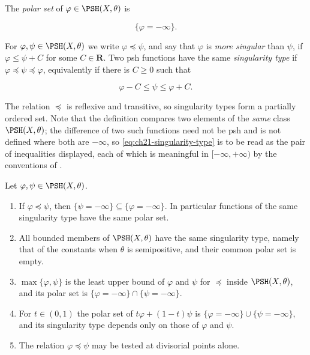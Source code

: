 \begin{definition}
\label{def:ch21-polar-singularity}
The \emph{polar set} of $\varphi\in\PSH(X,\theta)$ is

\[
                         \{\varphi=-\infty\}.
\]

For $\varphi,\psi\in\PSH(X,\theta)$ we write $\varphi\preceq\psi$, and
say that $\varphi$ is \emph{more singular} than $\psi$, if
$\varphi\leq\psi+C$ for some $C\in\mathbf R$.  Two psh functions have
the same \emph{singularity type} if
$\varphi\preceq\psi\preceq\varphi$, equivalently if there is
$C\geq0$ such that

\begin{equation}
\label{eq:ch21-singularity-type}
                         \varphi-C\leq\psi\leq\varphi+C.
\end{equation}
\end{definition}

The relation $\preceq$ is reflexive and transitive, so singularity types
form a partially ordered set.  Note that the definition compares two
elements of the \emph{same} class $\PSH(X,\theta)$; the difference of two
such functions need not be psh and is not defined where both are
$-\infty$, so \eqref{eq:ch21-singularity-type} is to be
read as the pair of inequalities displayed, each of which is meaningful in
$[-\infty,+\infty)$ by the conventions of
.

\begin{proposition}
\label{prop:ch21-singularity-elementary}
Let $\varphi,\psi\in\PSH(X,\theta)$.
\begin{enumerate}
\item\label{itm:ch21-sing:polar}
If $\varphi\preceq\psi$, then
$\{\psi=-\infty\}\subseteq\{\varphi=-\infty\}$.  In particular functions
of the same singularity type have the same polar set.
\item\label{itm:ch21-sing:bounded}
All bounded members of $\PSH(X,\theta)$ have the same singularity type,
namely that of the constants when $\theta$ is semipositive, and their
common polar set is empty.
\item\label{itm:ch21-sing:max}
$\max\{\varphi,\psi\}$ is the least upper bound of $\varphi$ and
$\psi$ for $\preceq$ inside $\PSH(X,\theta)$, and its polar set is
$\{\varphi=-\infty\}\cap\{\psi=-\infty\}$.
\item\label{itm:ch21-sing:convex}
For $t\in(0,1)$ the polar set of $t\varphi+(1-t)\psi$ is
$\{\varphi=-\infty\}\cup\{\psi=-\infty\}$, and its singularity type
depends only on those of $\varphi$ and $\psi$.
\item\label{itm:ch21-sing:divisorial}
The relation $\varphi\preceq\psi$ may be tested at divisorial points
alone.
\end{enumerate}
\end{proposition}

